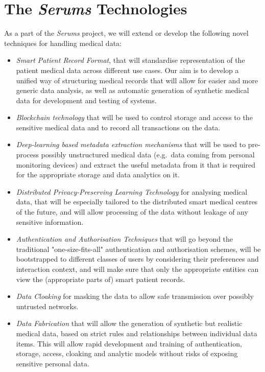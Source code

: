 \documentclass[sigconf]{acmart}
\begin{document}

\section{The \emph{Serums} Technologies}
\noindent
As a part of the \emph{Serums} project, we will extend or develop the following novel techniques for handling medical data:
\begin{itemize}
\item \emph{Smart Patient Record Format}, that will standardise representation of the patient medical data across different use cases. Our aim is to develop a unified way of structuring medical records that will allow for easier and more generic data analysis, as well as automatic generation of synthetic medical data for development and testing of systems.
\item \emph{Blockchain technology} that will be used to control storage and access to the sensitive medical data and to record all transactions on the data.
\item \emph{Deep-learning based metadata extraction mechanisms} that will be used to pre-process possibly unstructured medical data (e.g.~data coming from personal monitoring devices) and extract the useful metadata from it that is required for the appropriate storage and data analytics on it.
\item \emph{Distributed Privacy-Preserving Learning Technology} for analy\-sing medical data, that will be especially tailored to the distributed smart medical centres of the future, and will allow processing of the data without leakage of any sensitive information.
\item \emph{Authentication and Authorisation Techniques} that will go beyond the traditional "one-size-fits-all" authentication and authorisation schemes, will be bootstrapped to different classes of users by considering their preferences and interaction context, and will make sure that only the appropriate entities can view the (appropriate parts of) smart patient records.
\item \emph{Data Cloaking} for masking the data to allow safe transmission over possibly untrusted networks.
\item \emph{Data Fabrication} that will allow the generation of synthetic but realistic medical data, based on strict rules and relationships between individual data items. This will allow rapid development and training of authentication, storage, access, cloaking and analytic models without risks of exposing sensitive personal data.
\end{itemize}
\end{document}
